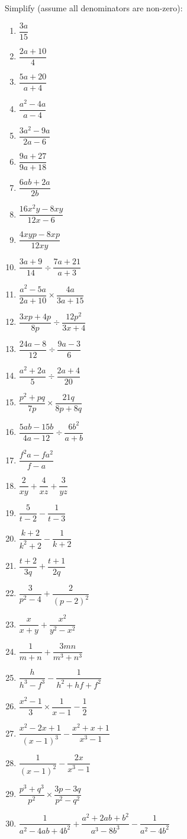 \begin{exercises}{}
{
Simplify (assume all denominators are non-zero):
\begin{multicols}{2}
\begin{enumerate}[itemsep=5pt, label=\textbf{\arabic*}. ] 
\item$\dfrac{3a}{15}$
\item $\dfrac{2a+10}{4}$
\item $\dfrac{5a+20}{a+4}$
\item $\dfrac{{a}^{2}-4a}{a-4}$
\item $\dfrac{3{a}^{2}-9a}{2a-6}$
\item $\dfrac{9a+27}{9a+18}$
\item $\dfrac{6ab+2a}{2b}$
\item $\dfrac{16{x}^{2}y-8xy}{12x-6}$
\item $\dfrac{4xyp-8xp}{12xy}$
\item $\dfrac{3a+9}{14}÷\dfrac{7a+21}{a+3}$
\item $\dfrac{{a}^{2}-5a}{2a+10} \times \dfrac{4a}{3a+15}$
\item $\dfrac{3xp+4p}{8p}÷\dfrac{12{p}^{2}}{3x+4}$
\item $\dfrac{24a-8}{12}÷\dfrac{9a-3}{6}$
\item $\dfrac{{a}^{2}+2a}{5}÷\dfrac{2a+4}{20}$
\item $\dfrac{{p}^{2}+pq}{7p} \times \dfrac{21q}{8p+8q}$
\item $\dfrac{5ab-15b}{4a-12}÷\dfrac{6{b}^{2}}{a+b}$
\item $\dfrac{{f}^{2}a-f{a}^{2}}{f-a}$
\item $\dfrac{2}{xy} + \dfrac{4}{xz}+\dfrac{3}{yz}$
\item $\dfrac{5}{t-2} - \dfrac{1}{t-3}$
\item $\dfrac{k+2}{k^{2} +2} - \dfrac{1}{k+2}$
\item $\dfrac{t+2}{3q} + \dfrac{t+1}{2q}$
\item $\dfrac{3}{p^{2}-4}+\dfrac{2}{(p-2)^{2}}$
\item $\dfrac{x}{x+y}+\dfrac{x^{2}}{y^{2} - x^{2}}$
\item $\dfrac{1}{m+n} + \dfrac{3mn}{m^{3} + n^{3}}$
\item $\dfrac{h}{h^{3}-f^{3}} - \dfrac{1}{h^{2} + hf + f^{2}}$
\item $\dfrac{{x}^{2}-1}{3}\times\dfrac{1}{x-1}-\dfrac{1}{2}$
\item  $\dfrac{x^2-2x+1}{(x-1)^3} - \dfrac{x^2+x+1}{x^3-1}$
\item $\dfrac{1}{(x-1)^2} - \dfrac{2x}{x^3-1}$
\item $\dfrac{p^3 + q^3}{p^2} \times \dfrac{3p-3q}{p^2-q^2}$
\item $\dfrac{1}{a^2-4ab+4b^2} + \dfrac{a^2+2ab+b^2}{a^3-8b^3} - \dfrac{1}{a^2-4b^2}$
\end{enumerate}
\end{multicols}

}
\end{exercises}

